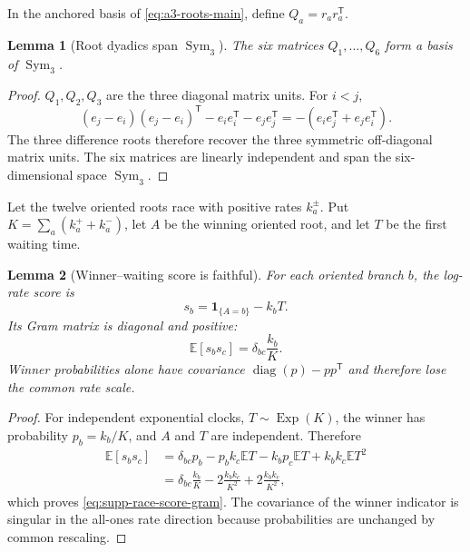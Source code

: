 \documentclass[11pt]{article}
\numberwithin{equation}{section}
\newtheorem{lemma}[lemma]{Lemma}
\theoremstyle{definition}
\theoremstyle{remark}
\newcommand{\one}{\mathbf 1}
\newcommand{\diag}{\operatorname{diag}}
\newcommand{\Sym}{\operatorname{Sym}}
\begin{document}
In the anchored basis of \eqref{eq:a3-roots-main}, define
$Q_a=r_ar_a^{\mathsf T}$.

\begin{lemma}[Root dyadics span $\Sym_3$]
\label{lem:supp-root-frame}
The six matrices $Q_1,\ldots,Q_6$ form a basis of $\Sym_3$.
\end{lemma}

\begin{proof}
$Q_1,Q_2,Q_3$ are the three diagonal matrix units.  For $i<j$,
\[
 (e_j-e_i)(e_j-e_i)^{\mathsf T}-e_ie_i^{\mathsf T}-e_je_j^{\mathsf T}
 =-(e_ie_j^{\mathsf T}+e_je_i^{\mathsf T}).
\]
The three difference roots therefore recover the three symmetric off-diagonal
matrix units.  The six matrices are linearly independent and span the
six-dimensional space $\Sym_3$.
\end{proof}

Let the twelve oriented roots race with positive rates $k_a^\pm$.  Put
$K=\sum_a(k_a^++k_a^-)$, let $A$ be the winning oriented root, and let $T$ be
the first waiting time.

\begin{lemma}[Winner--waiting score is faithful]
\label{lem:supp-race-score}
For each oriented branch $b$, the log-rate score is
\begin{equation}
 s_b=\one_{\{A=b\}}-k_bT.
 \label{eq:supp-race-score}
\end{equation}
Its Gram matrix is diagonal and positive:
\begin{equation}
 \mathbb E[s_bs_c]=\delta_{bc}\frac{k_b}{K}.
 \label{eq:supp-race-score-gram}
\end{equation}
Winner probabilities alone have covariance
$\diag(p)-pp^{\mathsf T}$ and therefore lose the common rate scale.
\end{lemma}

\begin{proof}
For independent exponential clocks, $T\sim\operatorname{Exp}(K)$, the winner
has probability $p_b=k_b/K$, and $A$ and $T$ are independent.  Therefore
\[
 \begin{aligned}
 \mathbb E[s_bs_c]
 &={}\delta_{bc}p_b-p_bk_c\mathbb ET-k_bp_c\mathbb ET
      +k_bk_c\mathbb ET^2\\
 &={}\delta_{bc}\frac{k_b}{K}
   -2\frac{k_bk_c}{K^2}+2\frac{k_bk_c}{K^2},
 \end{aligned}
\]
which proves \eqref{eq:supp-race-score-gram}.  The covariance of the winner
indicator is singular in the all-ones rate direction because probabilities
are unchanged by common rescaling.
\end{proof}
\end{document}
